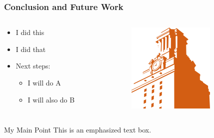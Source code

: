 \documentclass[18pt,xcolor=table]{beamer}
\begin{document}
\begin{frame}
    \frametitle{Conclusion and Future Work}
    \begin{columns}
    \begin{column}{0.5\linewidth}
        \begin{itemize}
            \item I did this
            \item I did that
            \item Next steps:
            \begin{itemize}
                \item I will do A
                \item I will also do B
            \end{itemize}
        \end{itemize}
    \end{column}%
    \begin{column}{0.5\linewidth}
        \centering
        \includegraphics[scale=0.8]{figs/ut_tower.png}
    \end{column}
    \end{columns}
    \vspace{0.5cm}
    \begin{block}{My Main Point}
        This is an emphasized text box.
    \end{block}
\end{frame}


    
\end{document}
